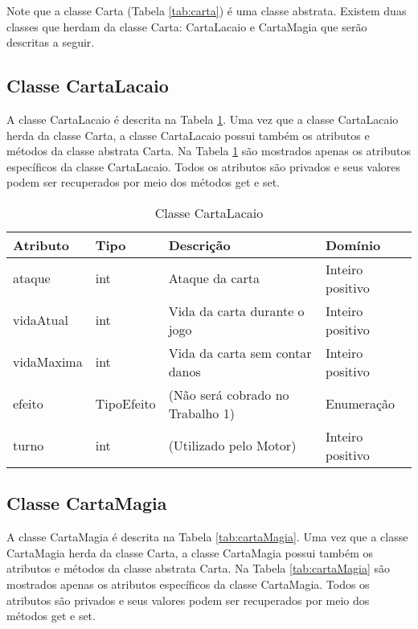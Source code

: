 \documentclass[10pt]{article}
\begin{document}
Note que a classe Carta (Tabela \ref{tab:carta}) é uma classe abstrata. Existem duas classes que herdam da classe Carta: CartaLacaio e CartaMagia que serão descritas a seguir.

\subsection{Classe CartaLacaio}

A classe CartaLacaio é descrita na Tabela \ref{tab:cartaLacaio}. Uma vez que a classe CartaLacaio herda da classe Carta, a classe CartaLacaio possui também os atributos e métodos da classe abstrata Carta. Na Tabela \ref{tab:cartaLacaio} são mostrados apenas os atributos específicos da classe CartaLacaio. Todos os atributos são privados e seus valores podem ser recuperados por meio dos métodos get e set. 


\renewcommand{\arraystretch}{1.15}
\begin{table}[h]
\centering
\caption{Classe CartaLacaio}
\label{tab:cartaLacaio}
\begin{tabular}{|l|l|p{5cm}|p{4cm}|}
\hline
Atributo & Tipo & Descrição & Domínio \\ \hline
ataque   & int       & Ataque da carta        & Inteiro positivo               \\ \hline
vidaAtual & int       & Vida da carta durante o jogo & Inteiro positivo                \\ \hline
vidaMaxima & int  & Vida da carta sem contar danos & Inteiro positivo                \\ \hline
efeito     & TipoEfeito & (Não será cobrado no Trabalho 1) & Enumeração \\ \hline
turno     & int       & (Utilizado pelo Motor) & Inteiro positivo                \\ \hline
\end{tabular}
\end{table}

\subsection{Classe CartaMagia}

A classe CartaMagia é descrita na Tabela \ref{tab:cartaMagia}. Uma vez que a classe CartaMagia herda da classe Carta, a classe CartaMagia possui também os atributos e métodos da classe abstrata Carta. Na Tabela \ref{tab:cartaMagia} são mostrados apenas os atributos específicos da classe CartaMagia. Todos os atributos são privados e seus valores podem ser recuperados por meio dos métodos get e set. 
\end{document}
